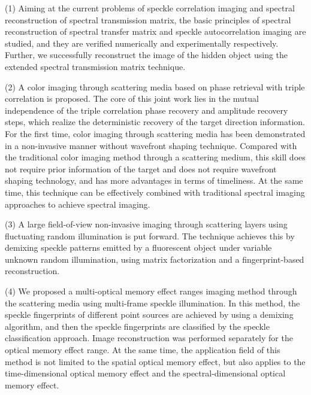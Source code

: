\begin{englishabstract}
(1) Aiming at the current problems of speckle correlation imaging and spectral reconstruction of spectral transmission matrix, the basic principles of spectral reconstruction of spectral transfer matrix and speckle autocorrelation imaging are studied, and they are verified numerically and experimentally respectively. Further, we successfully reconstruct the image of the hidden object using the extended spectral transmission matrix technique.

(2) A color imaging through scattering media based on phase retrieval with triple correlation is proposed. The core of this joint work lies in the mutual independence of the triple correlation phase recovery and amplitude recovery steps, which realize the deterministic recovery of the target direction information. For the first time, color imaging through scattering media has been demonstrated in a non-invasive manner without wavefront shaping technique. Compared with the traditional color imaging method through a scattering medium, this skill does not require prior information of the target and does not require wavefront shaping technology, and has more advantages in terms of timeliness. At the same time, this technique can be effectively combined with traditional spectral imaging approaches to achieve spectral imaging.

(3) A large field-of-view non-invasive imaging through scattering layers using fluctuating random illumination is put forward. The technique achieves this by demixing speckle patterns emitted by a fluorescent object under variable unknown random illumination, using matrix factorization and a fingerprint-based reconstruction.

(4) We proposed a multi-optical memory effect ranges imaging method through the scattering media using multi-frame speckle illumination. In this method, the speckle fingerprints of different point sources are achieved by using a demixing algorithm, and then the speckle fingerprints are classified by the speckle classification approach. Image reconstruction was performed separately for the optical memory effect range. At the same time, the application field of this method is not limited to the spatial optical memory effect, but also applies to the time-dimensional optical memory effect and the spectral-dimensional optical memory effect.
\\
 \\

\end{englishabstract}



